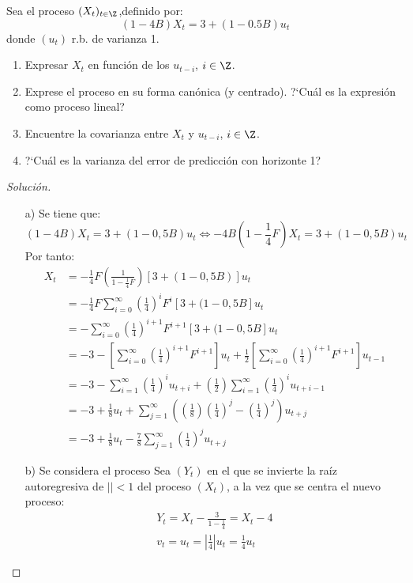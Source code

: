 \begin{ejemplo}
Sea el proceso $(X_{{t}})_{t\in \Z} $,definido por:
\[
(1-4B)X_{t} =3+(1-0.5B)u_{t} 
\]
donde $(u_{t})$ r.b. de varianza 1.
\begin{enumerate}
\item Expresar $X_{t}$ en funci\'{o}n de los $u_{t-i}$, $i\in \Z$.
\item Exprese el proceso en su forma can\'{o}nica (y centrado). ?`Cu\'{a}l es la expresi\'{o}n como proceso lineal?
\item Encuentre la covarianza entre $X_{t}$ y $u_{t-i}$, $i\in \Z$.
\item ?`Cu\'{a}l es la varianza del error de predicci\'{o}n con horizonte 1?
\end{enumerate}


\begin{proof}[Soluci\'{o}n]
\quad
\begin{enumerate}
\item[a)] Se tiene que:
\[
(1-4B)X_t=3+(1-0,5B)u_t\Longleftrightarrow -4B(1-\frac{1}{4}F)X_{t} 
=3+(1-0,5B)u_{t} 
\]
Por tanto: 
\begin{align*}
X_{t} 
	&=-\frac{1}{4}F\left( {\frac{1}{1-\frac{1}{4}F}} \right)\left[{3+(1-0,5B)} \right]u_{t}\\
	&=-\frac{1}{4}F\sum_{i=0}^\infty {\left({\frac{1}{4}} \right)^{i}F^{i}\left[ {3+(1-0,5B} \right]} u_{t} \\ 
	&=-\sum_{i=0}^\infty {\left( {\frac{1}{4}} \right)^{i+1}F^{i+1}\left[ {3+(1-0,5B} \right]u_{t} }\\
	&=-3-\left[{\sum_{i=0}^\infty {\left( {\frac{1}{4}} \right)^{i+1}F^{i+1}} } \right]u_{t} +\frac{1}{2}\left[ {\sum_{i=0}^\infty {\left( {\frac{1}{4}} \right)^{i+1}F^{i+1}} } \right]u_{t-1} \\ 
	&=-3-\sum_{i=1}^\infty {\left( {\frac{1}{4}} \right)^{i}u_{t+i} +\left( {\frac{1}{2}} \right)\sum_{i=1}^\infty {\left( {\frac{1}{4}} \right)^{i}u_{t+i-1} } }\\ &=-3+\frac{1}{8}u_{t} +\sum_{j=1}^\infty {\left( {\left( {\frac{1}{8}} \right)\left( {\frac{1}{4}} \right)^{j}-\left( {\frac{1}{4}} \right)^{j}} \right)u_{t+j} } \\ 
	&=-3+\frac{1}{8}u_{t} -\frac{7}{8}\sum_{j=1}^\infty {\left( {\frac{1}{4}} \right)^{j}u_{t+j} } 
\end{align*}

\item[b)] Se considera el proceso Sea $(Y_{t} )$ en el que se invierte la ra\'{i}z autoregresiva de $\left| \right|< 1$ del proceso $(X_{t} )$, a la vez que se centra el nuevo proceso:
\begin{gather*}
  Y_{t} =X_{t} -\frac{3}{1-\frac{1}{4}}=X_{t} -4 \\
  v_{t} =u_{t} =\left| {\frac{1}{4}} \right|u_{t} =\frac{1}{4}u_{t}
\end{gather*}


\end{enumerate}
\end{proof}
\end{ejemplo}
